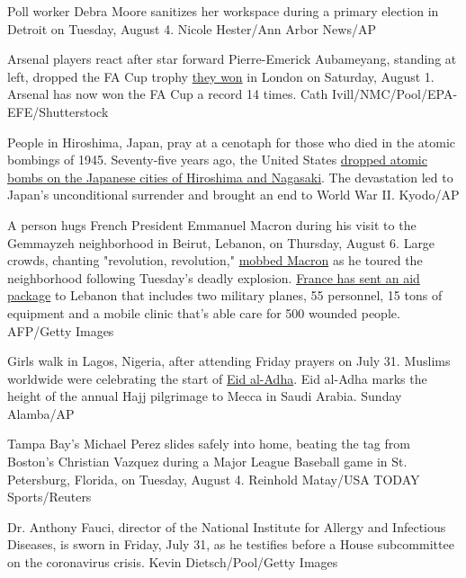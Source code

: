 Poll worker Debra Moore sanitizes her workspace during a primary
election in Detroit on Tuesday, August 4. Nicole Hester/Ann Arbor
News/AP

Arsenal players react after star forward Pierre-Emerick Aubameyang,
standing at left, dropped the FA Cup trophy
\href{https://www.cnn.com/2020/08/01/football/arsenal-chelsea-fa-cup-final-football-spt-intl/index.html}{they
won} in London on Saturday, August 1. Arsenal has now won the FA Cup a
record 14 times. Cath Ivill/NMC/Pool/EPA-EFE/Shutterstock

People in Hiroshima, Japan, pray at a cenotaph for those who died in the
atomic bombings of 1945. Seventy-five years ago, the United States
\href{https://www.cnn.com/2020/08/04/world/gallery/hiroshima-nagasaki-atomic-bomb/index.html}{dropped
atomic bombs on the Japanese cities of Hiroshima and Nagasaki}. The
devastation led to Japan's unconditional surrender and brought an end to
World War II. Kyodo/AP

A person hugs French President Emmanuel Macron during his visit to the
Gemmayzeh neighborhood in Beirut, Lebanon, on Thursday, August 6. Large
crowds, chanting "revolution, revolution,"
\href{https://www.cnn.com/2020/08/06/middleeast/beirut-explosion-anger-intl-hnk/index.html}{mobbed
Macron} as he toured the neighborhood following Tuesday's deadly
explosion.
\href{https://www.cnn.com/middleeast/live-news/beirut-lebanon-explosion-08-06-2020/h_8e4d94733d3dd5c37c7d0cc1c364fb8c}{France
has sent an aid package} to Lebanon that includes two military planes,
55 personnel, 15 tons of equipment and a mobile clinic that's able care
for 500 wounded people. AFP/Getty Images

Girls walk in Lagos, Nigeria, after attending Friday prayers on July 31.
Muslims worldwide were celebrating the start of
\href{https://www.cnn.com/2020/07/31/world/eid-pandemic-scli-intl/index.html}{Eid
al-Adha}. Eid al-Adha marks the height of the annual Hajj pilgrimage to
Mecca in Saudi Arabia. Sunday Alamba/AP

Tampa Bay's Michael Perez slides safely into home, beating the tag from
Boston's Christian Vazquez during a Major League Baseball game in St.
Petersburg, Florida, on Tuesday, August 4. Reinhold Matay/USA TODAY
Sports/Reuters

Dr. Anthony Fauci, director of the National Institute for Allergy and
Infectious Diseases, is sworn in Friday, July 31, as he testifies before
a House subcommittee on the coronavirus crisis. Kevin Dietsch/Pool/Getty
Images

